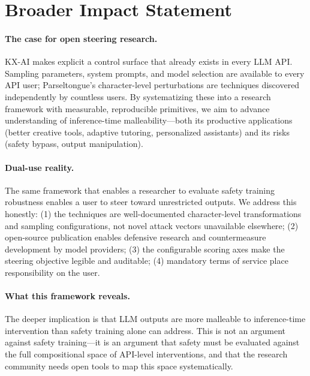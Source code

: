 \documentclass[11pt]{article}
\begin{document}
\section*{Broader Impact Statement}

\paragraph{The case for open steering research.} KX-AI makes explicit a control surface that already exists in every LLM API. Sampling parameters, system prompts, and model selection are available to every API user; Parseltongue's character-level perturbations are techniques discovered independently by countless users. By systematizing these into a research framework with measurable, reproducible primitives, we aim to advance understanding of inference-time malleability---both its productive applications (better creative tools, adaptive tutoring, personalized assistants) and its risks (safety bypass, output manipulation).

\paragraph{Dual-use reality.} The same framework that enables a researcher to evaluate safety training robustness enables a user to steer toward unrestricted outputs. We address this honestly: (1) the techniques are well-documented character-level transformations and sampling configurations, not novel attack vectors unavailable elsewhere; (2) open-source publication enables defensive research and countermeasure development by model providers; (3) the configurable scoring axes make the steering objective legible and auditable; (4) mandatory terms of service place responsibility on the user.

\paragraph{What this framework reveals.} The deeper implication is that LLM outputs are more malleable to inference-time intervention than safety training alone can address. This is not an argument against safety training---it is an argument that safety must be evaluated against the full compositional space of API-level interventions, and that the research community needs open tools to map this space systematically.
\end{document}
